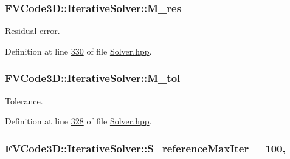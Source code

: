 \subsubsection[{\texorpdfstring{M\+\_\+res}{M_res}}]{ F\+V\+Code3\+D\+::\+Iterative\+Solver\+::\+M\+\_\+res\hspace{0.3cm}{\ttfamily [protected]}}\hypertarget{classFVCode3D_1_1IterativeSolver_a09fcf173955d9b61283e77b0fd4f2b3c}{}\label{classFVCode3D_1_1IterativeSolver_a09fcf173955d9b61283e77b0fd4f2b3c}


Residual error. 



Definition at line \hyperlink{Solver_8hpp_source_l00330}{330} of file \hyperlink{Solver_8hpp_source}{Solver.\+hpp}.

\subsubsection[{\texorpdfstring{M\+\_\+tol}{M_tol}}]{ F\+V\+Code3\+D\+::\+Iterative\+Solver\+::\+M\+\_\+tol\hspace{0.3cm}{\ttfamily [protected]}}\hypertarget{classFVCode3D_1_1IterativeSolver_a9ad5ace9146a6ba76957457ead56ba07}{}\label{classFVCode3D_1_1IterativeSolver_a9ad5ace9146a6ba76957457ead56ba07}


Tolerance. 



Definition at line \hyperlink{Solver_8hpp_source_l00328}{328} of file \hyperlink{Solver_8hpp_source}{Solver.\+hpp}.

\subsubsection[{\texorpdfstring{S\+\_\+reference\+Max\+Iter}{S_referenceMaxIter}}]{ F\+V\+Code3\+D\+::\+Iterative\+Solver\+::\+S\+\_\+reference\+Max\+Iter = 100\hspace{0.3cm}{\ttfamily [static]}, {\ttfamily [protected]}}\hypertarget{classFVCode3D_1_1IterativeSolver_a938effdbfaa21c23226bfedf904787c2}{}\label{classFVCode3D_1_1IterativeSolver_a938effdbfaa21c23226bfedf904787c2}


